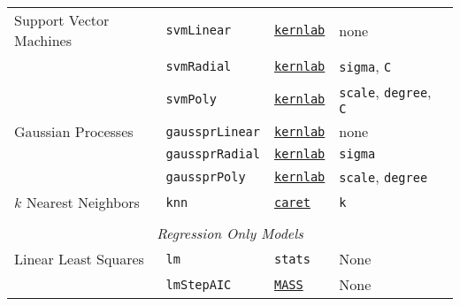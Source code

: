 \documentclass[12pt]{article}
\begin{document}
\begin{landscape}
\begin{longtable}{lllll}
      Support Vector Machines  &
         \texttt{svmLinear} & 
             {\tt \href{http://cran.r-project.org/web/packages/kernlab/index.html}{kernlab}}       & 
            none & \\              
      
  &
         \texttt{svmRadial} & 
            {\tt \href{http://cran.r-project.org/web/packages/kernlab/index.html}{kernlab}}      & 
            \texttt{sigma}, \texttt{C} & \\             
      
  &
         \texttt{svmPoly} & 
            {\tt \href{http://cran.r-project.org/web/packages/kernlab/index.html}{kernlab}}      & 
            \texttt{scale}, \texttt{degree}, \texttt{C} & \\            

\rowcolor[rgb]{.95, .95, .95}         
           Gaussian Processes  &
         \texttt{gaussprLinear} & 
            {\tt \href{http://cran.r-project.org/web/packages/kernlab/index.html}{kernlab}}      & 
            none & \\             
            
\rowcolor[rgb]{.95, .95, .95}               
  &
         \texttt{gaussprRadial} & 
             {\tt \href{http://cran.r-project.org/web/packages/kernlab/index.html}{kernlab}}        & 
            \texttt{sigma} & \\              

\rowcolor[rgb]{.95, .95, .95}               
  &
         \texttt{gaussprPoly} & 
             {\tt \href{http://cran.r-project.org/web/packages/kernlab/index.html}{kernlab}}       & 
            \texttt{scale}, \texttt{degree} & \\            

                      
      $k$ Nearest Neighbors &
         \texttt{knn} & 
             {\tt \href{http://cran.r-project.org/web/packages/caret/index.html}{caret}}       & 
            \texttt{k} & \\   
      
      \\
\multicolumn{5}{c}{{{ \em Regression Only Models}}} \\      
    
\rowcolor[rgb]{.95, .95, .95}             
      Linear Least Squares &
         \texttt{lm} & 
            \texttt{stats}       & 
            None & \\  
            
\rowcolor[rgb]{.95, .95, .95}                     
            &
         \texttt{lmStepAIC} & 
             {\tt \href{http://cran.r-project.org/web/packages/MASS/index.html}{MASS}}       & 
            None & \\  


\end{longtable}
\end{landscape}
\end{document}
